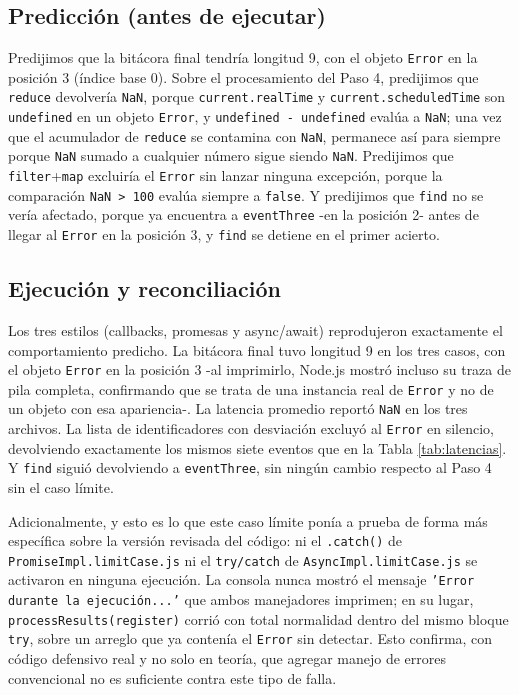 \documentclass[conference,a4paper]{IEEEtran}
\begin{document}
\subsection{Predicci\'on (antes de ejecutar)}
Predijimos que la bit\'acora final tendr\'ia longitud 9, con el objeto \texttt{Error} en la posici\'on 3 (\'indice base 0). Sobre el procesamiento del Paso 4, predijimos que \texttt{reduce} devolver\'ia \texttt{NaN}, porque \texttt{current.realTime} y \texttt{current.scheduledTime} son \texttt{undefined} en un objeto \texttt{Error}, y \texttt{undefined - undefined} eval\'ua a \texttt{NaN}; una vez que el acumulador de \texttt{reduce} se contamina con \texttt{NaN}, permanece as\'i para siempre porque \texttt{NaN} sumado a cualquier n\'umero sigue siendo \texttt{NaN}. Predijimos que \texttt{filter}+\texttt{map} excluir\'ia el \texttt{Error} sin lanzar ninguna excepci\'on, porque la comparaci\'on \texttt{NaN > 100} eval\'ua siempre a \texttt{false}. Y predijimos que \texttt{find} no se ver\'ia afectado, porque ya encuentra a \texttt{eventThree} -en la posici\'on 2- antes de llegar al \texttt{Error} en la posici\'on 3, y \texttt{find} se detiene en el primer acierto.

\subsection{Ejecuci\'on y reconciliaci\'on}
Los tres estilos (callbacks, promesas y async/await) reprodujeron exactamente el comportamiento predicho. La bit\'acora final tuvo longitud 9 en los tres casos, con el objeto \texttt{Error} en la posici\'on 3 -al imprimirlo, Node.js mostr\'o incluso su traza de pila completa, confirmando que se trata de una instancia real de \texttt{Error} y no de un objeto con esa apariencia-. La latencia promedio report\'o \texttt{NaN} en los tres archivos. La lista de identificadores con desviaci\'on excluy\'o al \texttt{Error} en silencio, devolviendo exactamente los mismos siete eventos que en la Tabla \ref{tab:latencias}. Y \texttt{find} sigui\'o devolviendo a \texttt{eventThree}, sin ning\'un cambio respecto al Paso 4 sin el caso l\'imite.

Adicionalmente, y esto es lo que este caso l\'imite pon\'ia a prueba de forma m\'as espec\'ifica sobre la versi\'on revisada del c\'odigo: ni el \texttt{.catch()} de \texttt{PromiseImpl.limitCase.js} ni el \texttt{try/catch} de \texttt{AsyncImpl.limitCase.js} se activaron en ninguna ejecuci\'on. La consola nunca mostr\'o el mensaje \texttt{'Error durante la ejecuci\'on...'} que ambos manejadores imprimen; en su lugar, \texttt{processResults(register)} corri\'o con total normalidad dentro del mismo bloque \texttt{try}, sobre un arreglo que ya conten\'ia el \texttt{Error} sin detectar. Esto confirma, con c\'odigo defensivo real y no solo en teor\'ia, que agregar manejo de errores convencional no es suficiente contra este tipo de falla.
\end{document}

